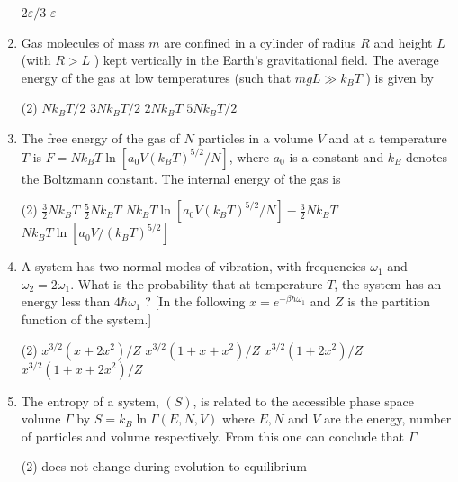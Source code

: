 \begin{enumerate}
\begin{tasks}
	\task[\textbf{c.}]$2 \varepsilon / 3$
	\task[\textbf{d.}]  $\varepsilon$
\end{tasks}	
\item 	Gas molecules of mass $m$ are confined in a cylinder of radius $R$ and height $L$ (with $R>L$ ) kept vertically in the Earth's gravitational field. The average energy of the gas at low temperatures (such that $m g L \gg k_{B} T$ ) is given by
{	}
	 \begin{tasks}(2)
		\task[\textbf{a.}]$N k_{B} T / 2$
		\task[\textbf{b.}]$3 N k_{B} T / 2$
		\task[\textbf{c.}]$2 N k_{B} T$
		\task[\textbf{d.}] $5 N k_{B} T / 2$
	\end{tasks}
\item 	The free energy of the gas of $N$ particles in a volume $V$ and at a temperature $T$ is $F=N k_{B} T \ln \left[a_{0} V\left(k_{B} T\right)^{5 / 2} / N\right]$, where $a_{0}$ is a constant and $k_{B}$ denotes the Boltzmann constant. The internal energy of the gas is
{	}
 \begin{tasks}(2)
	\task[\textbf{a.}]$\frac{3}{2} N k_{B} T$
	\task[\textbf{b.}]$\frac{5}{2} N k_{B} T$
	\task[\textbf{c.}]$N k_{B} T \ln \left[a_{0} V\left(k_{B} T\right)^{5 / 2} / N\right]-\frac{3}{2} N k_{B} T$
	\task[\textbf{d.}]  $N k_{B} T \ln \left[a_{0} V /\left(k_{B} T\right)^{5 / 2}\right]$
\end{tasks}	
	\item A system has two normal modes of vibration, with frequencies $\omega_{1}$ and $\omega_{2}=2 \omega_{1}$. What is the probability that at temperature $T$, the system has an energy less than $4 \hbar \omega_{1}$ ?
	[In the following $x=e^{-\beta \hbar \omega_{1}}$ and $Z$ is the partition function of the system.]
	{	}
	 \begin{tasks}(2)
		\task[\textbf{a.}]$x^{3 / 2}\left(x+2 x^{2}\right) / Z$
		\task[\textbf{b.}]$x^{3 / 2}\left(1+x+x^{2}\right) / Z$
		\task[\textbf{c.}]$x^{3 / 2}\left(1+2 x^{2}\right) / Z$
		\task[\textbf{d.}] $x^{3 / 2}\left(1+x+2 x^{2}\right) / Z$
	\end{tasks}
\item 	The entropy of a system, $(S)$, is related to the accessible phase space volume $\Gamma$ by $S=k_{B} \ln \Gamma(E, N, V)$ where $E, N$ and $V$ are the energy, number of particles and volume respectively. From this one can conclude that $\Gamma$
{	}
	 \begin{tasks}(2)
		\task[\textbf{a.}]does not change during evolution to equilibrium

\end{tasks}
\end{enumerate}
